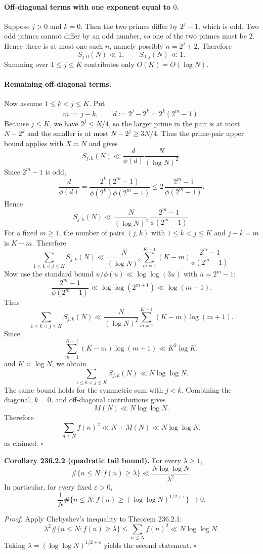 \paragraph{Off-diagonal terms with one exponent equal to $0$.}
Suppose $j>0$ and $k=0$. Then the two primes differ by $2^j-1$, which is odd. Two odd primes cannot differ by an odd number, so one of the two primes must be $2$. Hence there is at most one such $n$, namely possibly $n=2^j+2$. Therefore
\[
S_{j,0}(N)\ll 1,
\qquad
S_{0,j}(N)\ll 1.
\]
Summing over $1\le j\le K$ contributes only $O(K)=O(\log N)$.

\paragraph{Remaining off-diagonal terms.}
Now assume $1\le k<j\le K$. Put
\[
m:=j-k,
\qquad
d:=2^j-2^k = 2^k(2^m-1).
\]
Because $j\le K$, we have $2^j\le N/4$, so the larger prime in the pair is at most $N-2^k$ and the smaller is at most $N-2^j\ge 3N/4$. Thus the prime-pair upper bound applies with $X\asymp N$ and gives
\[
S_{j,k}(N)\ll \frac{d}{\phi(d)}\frac{N}{(\log N)^2}.
\]
Since $2^m-1$ is odd,
\[
\frac{d}{\phi(d)}=
\frac{2^k(2^m-1)}{\phi(2^k)\phi(2^m-1)}
\le
2\,\frac{2^m-1}{\phi(2^m-1)}.
\]
Hence
\[
S_{j,k}(N)\ll \frac{N}{(\log N)^2}\,\frac{2^m-1}{\phi(2^m-1)}.
\]
For a fixed $m\ge 1$, the number of pairs $(j,k)$ with $1\le k<j\le K$ and $j-k=m$ is $K-m$. Therefore
\[
\sum_{1\le k<j\le K} S_{j,k}(N)
\ll
\frac{N}{(\log N)^2}
\sum_{m=1}^{K-1}(K-m)\frac{2^m-1}{\phi(2^m-1)}.
\]
Now use the standard bound $u/\phi(u)\ll \log\log(3u)$ with $u=2^m-1$:
\[
\frac{2^m-1}{\phi(2^m-1)}\ll \log\log(2^{m+1})\ll \log(m+1).
\]
Thus
\[
\sum_{1\le k<j\le K} S_{j,k}(N)
\ll
\frac{N}{(\log N)^2}
\sum_{m=1}^{K-1}(K-m)\log(m+1).
\]
Since
\[
\sum_{m=1}^{K-1}(K-m)\log(m+1)\ll K^2\log K,
\]
and $K\asymp \log N$, we obtain
\[
\sum_{1\le k<j\le K} S_{j,k}(N)\ll N\log\log N.
\]
The same bound holds for the symmetric sum with $j<k$. Combining the diagonal, $k=0$, and off-diagonal contributions gives
\[
M(N)\ll N\log\log N.
\]
Therefore
\[
\sum_{n\le N} f(n)^2 \ll N + M(N)\ll N\log\log N,
\]
as claimed.
\hfill$\square$
\medskip

\noindent
\textbf{Corollary 236.2.2 (quadratic tail bound).}
For every $\lambda\ge 1$,
\[
\#\{n\le N:f(n)\ge \lambda\}\ll \frac{N\log\log N}{\lambda^2}.
\]
In particular, for every fixed $\varepsilon>0$,
\[
\frac{1}{N}\#\{n\le N:f(n)\ge (\log\log N)^{1/2+\varepsilon}\}\to 0.
\]

\emph{Proof.}
Apply Chebyshev's inequality to Theorem 236.2.1:
\[
\lambda^2\#\{n\le N:f(n)\ge \lambda\}
\le
\sum_{n\le N} f(n)^2
\ll N\log\log N.
\]
Taking $\lambda=(\log\log N)^{1/2+\varepsilon}$ yields the second statement.
\hfill$\square$

